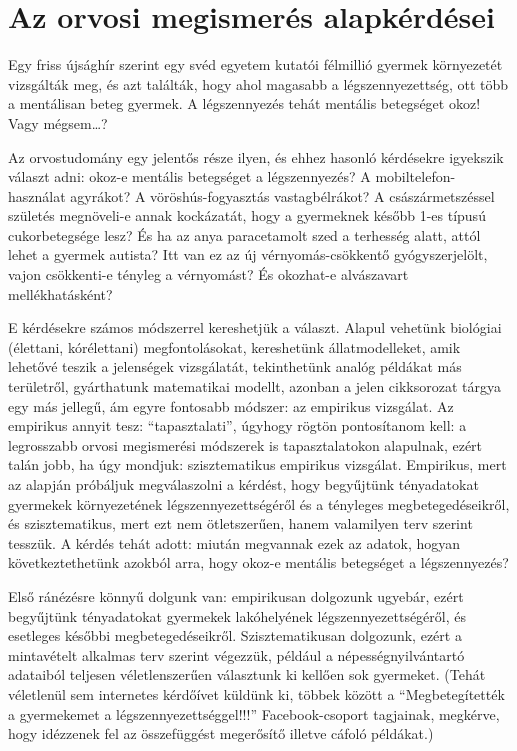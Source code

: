 \documentclass[magyar,]{book}
\begin{document}
\hypertarget{az-orvosi-megismeruxe9s-alapkuxe9rduxe9sei}{%
\section{Az orvosi megismerés alapkérdései}\label{az-orvosi-megismeruxe9s-alapkuxe9rduxe9sei}}

Egy friss újsághír szerint egy svéd egyetem kutatói félmillió gyermek környezetét vizsgálták meg, és azt találták, hogy ahol magasabb a légszennyezettség, ott több a mentálisan beteg gyermek. A légszennyezés tehát mentális betegséget okoz! Vagy mégsem\ldots?

Az orvostudomány egy jelentős része ilyen, és ehhez hasonló kérdésekre igyekszik választ adni: okoz-e mentális betegséget a légszennyezés? A mobiltelefon-használat agyrákot? A vöröshús-fogyasztás vastagbélrákot? A császármetszéssel születés megnöveli-e annak kockázatát, hogy a gyermeknek később 1-es típusú cukorbetegsége lesz? És ha az anya paracetamolt szed a terhesség alatt, attól lehet a gyermek autista? Itt van ez az új vérnyomás-csökkentő gyógyszerjelölt, vajon csökkenti-e tényleg a vérnyomást? És okozhat-e alvászavart mellékhatásként?

E kérdésekre számos módszerrel kereshetjük a választ. Alapul vehetünk biológiai (élettani, kórélettani) megfontolásokat, kereshetünk állatmodelleket, amik lehetővé teszik a jelenségek vizsgálatát, tekinthetünk analóg példákat más területről, gyárthatunk matematikai modellt, azonban a jelen cikksorozat tárgya egy más jellegű, ám egyre fontosabb módszer: az empirikus vizsgálat. Az empirikus annyit tesz: \enquote{tapasztalati}, úgyhogy rögtön pontosítanom kell: a legrosszabb orvosi megismerési módszerek is tapasztalatokon alapulnak, ezért talán jobb, ha úgy mondjuk: szisztematikus empirikus vizsgálat. Empirikus, mert az alapján próbáljuk megválaszolni a kérdést, hogy begyűjtünk tényadatokat gyermekek környezetének légszennyezettségéről és a tényleges megbetegedéseikről, és szisztematikus, mert ezt nem ötletszerűen, hanem valamilyen terv szerint tesszük. A kérdés tehát adott: miután megvannak ezek az adatok, hogyan következtethetünk azokból arra, hogy okoz-e mentális betegséget a légszennyezés?

Első ránézésre könnyű dolgunk van: empirikusan dolgozunk ugyebár, ezért begyűjtünk tényadatokat gyermekek lakóhelyének légszennyezettségéről, és esetleges későbbi megbetegedéseikről. Szisztematikusan dolgozunk, ezért a mintavételt alkalmas terv szerint végezzük, például a népességnyilvántartó adataiból teljesen véletlenszerűen választunk ki kellően sok gyermeket. (Tehát véletlenül sem internetes kérdőívet küldünk ki, többek között a \enquote{Megbetegítették a gyermekemet a légszennyezettséggel!!!} Facebook-csoport tagjainak, megkérve, hogy idézzenek fel az összefüggést megerősítő illetve cáfoló példákat.)
\end{document}
